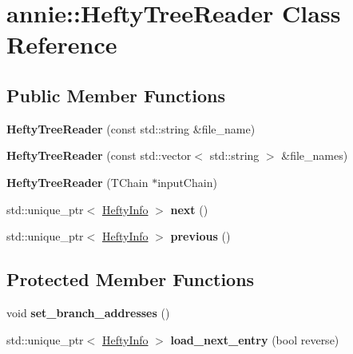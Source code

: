 \hypertarget{classannie_1_1HeftyTreeReader}{\section{annie\-:\-:Hefty\-Tree\-Reader Class Reference}
\label{classannie_1_1HeftyTreeReader}
}
\subsection*{Public Member Functions}
\begin{DoxyCompactItemize}
\item 
\hypertarget{classannie_1_1HeftyTreeReader_ac15660ea2670e502c68bc9f80793ae23}{{\bfseries Hefty\-Tree\-Reader} (const std\-::string \&file\-\_\-name)}\label{classannie_1_1HeftyTreeReader_ac15660ea2670e502c68bc9f80793ae23}

\item 
\hypertarget{classannie_1_1HeftyTreeReader_a70c65b445f31d18c7ce8c60bd67f2a62}{{\bfseries Hefty\-Tree\-Reader} (const std\-::vector$<$ std\-::string $>$ \&file\-\_\-names)}\label{classannie_1_1HeftyTreeReader_a70c65b445f31d18c7ce8c60bd67f2a62}

\item 
\hypertarget{classannie_1_1HeftyTreeReader_ab82488607c07679869f478b9ec7d88c7}{{\bfseries Hefty\-Tree\-Reader} (T\-Chain $\ast$input\-Chain)}\label{classannie_1_1HeftyTreeReader_ab82488607c07679869f478b9ec7d88c7}

\item 
\hypertarget{classannie_1_1HeftyTreeReader_a370da5616b748d31cedf3063769de5db}{std\-::unique\-\_\-ptr$<$ \hyperlink{classHeftyInfo}{Hefty\-Info} $>$ {\bfseries next} ()}\label{classannie_1_1HeftyTreeReader_a370da5616b748d31cedf3063769de5db}

\item 
\hypertarget{classannie_1_1HeftyTreeReader_a385017d9b438fc2118be8e67f5a8b7ac}{std\-::unique\-\_\-ptr$<$ \hyperlink{classHeftyInfo}{Hefty\-Info} $>$ {\bfseries previous} ()}\label{classannie_1_1HeftyTreeReader_a385017d9b438fc2118be8e67f5a8b7ac}

\end{DoxyCompactItemize}
\subsection*{Protected Member Functions}
\begin{DoxyCompactItemize}
\item 
\hypertarget{classannie_1_1HeftyTreeReader_a96aa45bd0418dd809a9b5b30f1b0d1c2}{void {\bfseries set\-\_\-branch\-\_\-addresses} ()}\label{classannie_1_1HeftyTreeReader_a96aa45bd0418dd809a9b5b30f1b0d1c2}

\item 
\hypertarget{classannie_1_1HeftyTreeReader_aeaabddbcd009a65cf22f45dc3b7d4650}{std\-::unique\-\_\-ptr$<$ \hyperlink{classHeftyInfo}{Hefty\-Info} $>$ {\bfseries load\-\_\-next\-\_\-entry} (bool reverse)}\label{classannie_1_1HeftyTreeReader_aeaabddbcd009a65cf22f45dc3b7d4650}

\end{DoxyCompactItemize}
